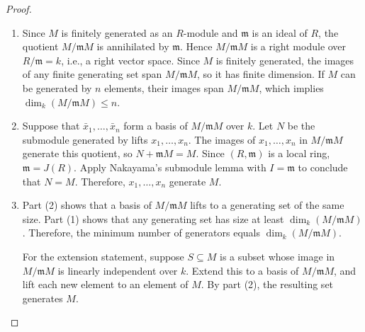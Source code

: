 \begin{proof}

	\begin{enumerate}
	    \item Since $M$ is finitely generated as an $R$-module and $\mathfrak{m}$ is an ideal of $R$, the quotient $M/\mathfrak{m}M$ is annihilated by $\mathfrak{m}$. Hence $M/\mathfrak{m}M$ is a right module over $R/\mathfrak{m} = k$, i.e., a right vector space. Since $M$ is finitely generated, the images of any finite generating set span $M/\mathfrak{m}M$, so it has finite dimension. If $M$ can be generated by $n$ elements, their images span $M/\mathfrak{m}M$, which implies $\dim_k(M/\mathfrak{m}M) \leq n$.

	    \item Suppose that $\bar{x}_1, \ldots, \bar{x}_n$ form a basis of $M/\mathfrak{m}M$ over $k$. Let $N$ be the submodule generated by lifts $x_1, \ldots, x_n$. The images of $x_1, \ldots, x_n$ in $M/\mathfrak{m}M$ generate this quotient, so $N + \mathfrak{m}M = M$. Since $(R, \mathfrak{m})$ is a local ring, $\mathfrak{m} = J(R)$. Apply Nakayama's submodule lemma with $I = \mathfrak{m}$ to conclude that $N = M$. Therefore, $x_1, \ldots, x_n$ generate $M$.

	    \item Part (2) shows that a basis of $M/\mathfrak{m}M$ lifts to a generating set of the same size. Part (1) shows that any generating set has size at least $\dim_k(M/\mathfrak{m}M)$. Therefore, the minimum number of generators equals $\dim_k(M/\mathfrak{m}M)$.

	    For the extension statement, suppose $S \subseteq M$ is a subset whose image in $M/\mathfrak{m}M$ is linearly independent over $k$. Extend this to a basis of $M/\mathfrak{m}M$, and lift each new element to an element of $M$. By part (2), the resulting set generates $M$.
	\end{enumerate}
\end{proof}
